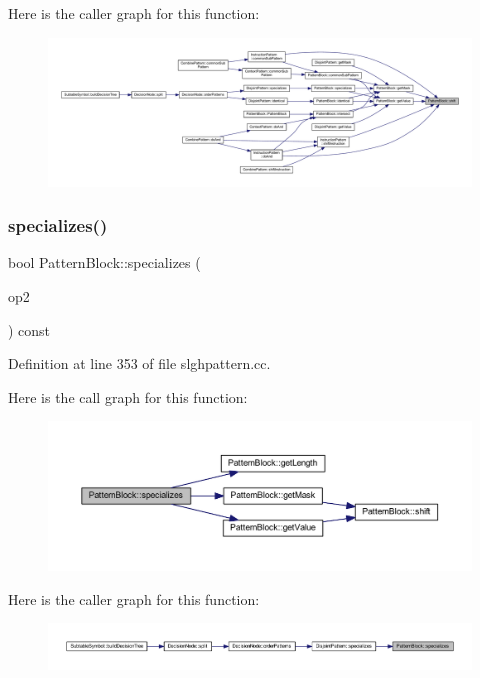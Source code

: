 Here is the caller graph for this function\+:
\nopagebreak
\begin{figure}[H]
\begin{center}
\leavevmode
\includegraphics[width=350pt]{class_pattern_block_ab159a1b0a1f22b8aae4bf17666a38aea_icgraph}
\end{center}
\end{figure}
\mbox{\label{class_pattern_block_aa98406ec9f84a2098fe9555c53f8db85}} 
\subsubsection{\texorpdfstring{specializes()}{specializes()}}
{\footnotesize\ttfamily bool Pattern\+Block\+::specializes (\begin{DoxyParamCaption}\item[{const \mbox{\hyperlink{class_pattern_block}{Pattern\+Block}} $\ast$}]{op2 }\end{DoxyParamCaption}) const}



Definition at line 353 of file slghpattern.\+cc.

Here is the call graph for this function\+:
\nopagebreak
\begin{figure}[H]
\begin{center}
\leavevmode
\includegraphics[width=350pt]{class_pattern_block_aa98406ec9f84a2098fe9555c53f8db85_cgraph}
\end{center}
\end{figure}
Here is the caller graph for this function\+:
\nopagebreak
\begin{figure}[H]
\begin{center}
\leavevmode
\includegraphics[width=350pt]{class_pattern_block_aa98406ec9f84a2098fe9555c53f8db85_icgraph}
\end{center}
\end{figure}


